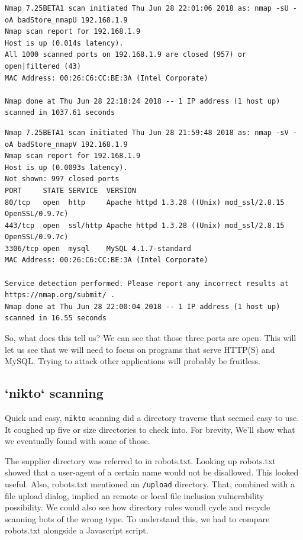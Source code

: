 \begin{lstlisting}
Nmap 7.25BETA1 scan initiated Thu Jun 28 22:01:06 2018 as: nmap -sU -oA badStore_nmapU 192.168.1.9
Nmap scan report for 192.168.1.9
Host is up (0.014s latency).
All 1000 scanned ports on 192.168.1.9 are closed (957) or open|filtered (43)
MAC Address: 00:26:C6:CC:BE:3A (Intel Corporate)

Nmap done at Thu Jun 28 22:18:24 2018 -- 1 IP address (1 host up) scanned in 1037.61 seconds
\end{lstlisting}

\begin{lstlisting}
Nmap 7.25BETA1 scan initiated Thu Jun 28 21:59:48 2018 as: nmap -sV -oA badStore_nmapV 192.168.1.9
Nmap scan report for 192.168.1.9
Host is up (0.0093s latency).
Not shown: 997 closed ports
PORT     STATE SERVICE  VERSION
80/tcp   open  http     Apache httpd 1.3.28 ((Unix) mod_ssl/2.8.15 OpenSSL/0.9.7c)
443/tcp  open  ssl/http Apache httpd 1.3.28 ((Unix) mod_ssl/2.8.15 OpenSSL/0.9.7c)
3306/tcp open  mysql    MySQL 4.1.7-standard
MAC Address: 00:26:C6:CC:BE:3A (Intel Corporate)

Service detection performed. Please report any incorrect results at https://nmap.org/submit/ .
Nmap done at Thu Jun 28 22:00:04 2018 -- 1 IP address (1 host up) scanned in 16.55 seconds
\end{lstlisting}

So, what does this tell us?  We can see that those three ports are open.  This will let us see that we will need to focus on programs that serve HTTP(S) and MySQL.  Trying to attack other applications will probably be fruitless.  

\subsection{`nikto` scanning}

Quick and easy, \texttt{nikto} scanning did a directory traverse that seemed easy to use.  It coughed up five or size directories to check into.  For brevity, We'll show what we eventually found with some of those.  

The supplier directory was referred to in robots.txt.  Looking up robots.txt showed that a user-agent of a certain name would not be disallowed.  This looked useful.  Also, robots.txt mentioned an \texttt{/upload} directory.  That, combined with a file upload dialog, implied an remote or local file inclusion vulnerability possibility.  We could also see how directory rules woudl cycle and recycle scanning bots of the wrong type.  To understand this, we had to compare robots.txt alongside a Javascript script.


